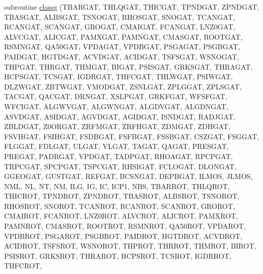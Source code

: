 \begin{DoxyCompactItemize}
subroutine \hyperlink{CLASSG_8f_ab216eee141d163cce79e9606e2374659}{classg} (T\+B\+A\+R\+G\+A\+T, T\+H\+L\+Q\+G\+A\+T, T\+H\+I\+C\+G\+A\+T, T\+P\+N\+D\+G\+A\+T, Z\+P\+N\+D\+G\+A\+T, T\+B\+A\+S\+G\+A\+T, A\+L\+B\+S\+G\+A\+T, T\+S\+N\+O\+G\+A\+T, R\+H\+O\+S\+G\+A\+T, S\+N\+O\+G\+A\+T, T\+C\+A\+N\+G\+A\+T, R\+C\+A\+N\+G\+A\+T, S\+C\+A\+N\+G\+A\+T, G\+R\+O\+G\+A\+T, C\+M\+A\+I\+G\+A\+T, F\+C\+A\+N\+G\+A\+T, L\+N\+Z0\+G\+A\+T, A\+L\+V\+C\+G\+A\+T, A\+L\+I\+C\+G\+A\+T, P\+A\+M\+X\+G\+A\+T, P\+A\+M\+N\+G\+A\+T, C\+M\+A\+S\+G\+A\+T, R\+O\+O\+T\+G\+A\+T, R\+S\+M\+N\+G\+A\+T, Q\+A50\+G\+A\+T, V\+P\+D\+A\+G\+A\+T, V\+P\+D\+B\+G\+A\+T, P\+S\+G\+A\+G\+A\+T, P\+S\+G\+B\+G\+A\+T, P\+A\+I\+D\+G\+A\+T, H\+G\+T\+D\+G\+A\+T, A\+C\+V\+D\+G\+A\+T, A\+C\+I\+D\+G\+A\+T, T\+S\+F\+S\+G\+A\+T, W\+S\+N\+O\+G\+A\+T, T\+H\+P\+G\+A\+T, T\+H\+R\+G\+A\+T, T\+H\+M\+G\+A\+T, B\+I\+G\+A\+T, P\+S\+I\+S\+G\+A\+T, G\+R\+K\+S\+G\+A\+T, T\+H\+R\+A\+G\+A\+T, H\+C\+P\+S\+G\+A\+T, T\+C\+S\+G\+A\+T, I\+G\+D\+R\+G\+A\+T, T\+H\+F\+C\+G\+A\+T, T\+H\+L\+W\+G\+A\+T, P\+S\+I\+W\+G\+A\+T, D\+L\+Z\+W\+G\+A\+T, Z\+B\+T\+W\+G\+A\+T, V\+M\+O\+D\+G\+A\+T, Z\+S\+N\+L\+G\+A\+T, Z\+P\+L\+G\+G\+A\+T, Z\+P\+L\+S\+G\+A\+T, T\+A\+C\+G\+A\+T, Q\+A\+C\+G\+A\+T, D\+R\+N\+G\+A\+T, X\+S\+L\+P\+G\+A\+T, G\+R\+K\+F\+G\+A\+T, W\+F\+S\+F\+G\+A\+T, W\+F\+C\+I\+G\+A\+T, A\+L\+G\+W\+V\+G\+A\+T, A\+L\+G\+W\+N\+G\+A\+T, A\+L\+G\+D\+V\+G\+A\+T, A\+L\+G\+D\+N\+G\+A\+T, A\+S\+V\+D\+G\+A\+T, A\+S\+I\+D\+G\+A\+T, A\+G\+V\+D\+G\+A\+T, A\+G\+I\+D\+G\+A\+T, I\+S\+N\+D\+G\+A\+T, R\+A\+D\+J\+G\+A\+T, Z\+B\+L\+D\+G\+A\+T, Z0\+O\+R\+G\+A\+T, Z\+R\+F\+M\+G\+A\+T, Z\+R\+F\+H\+G\+A\+T, Z\+D\+M\+G\+A\+T, Z\+D\+H\+G\+A\+T, F\+S\+V\+H\+G\+A\+T, F\+S\+I\+H\+G\+A\+T, F\+S\+D\+B\+G\+A\+T, F\+S\+F\+B\+G\+A\+T, F\+S\+S\+B\+G\+A\+T, C\+S\+Z\+G\+A\+T, F\+S\+G\+G\+A\+T, F\+L\+G\+G\+A\+T, F\+D\+L\+G\+A\+T, U\+L\+G\+A\+T, V\+L\+G\+A\+T, T\+A\+G\+A\+T, Q\+A\+G\+A\+T, P\+R\+E\+S\+G\+A\+T, P\+R\+E\+G\+A\+T, P\+A\+D\+R\+G\+A\+T, V\+P\+D\+G\+A\+T, T\+A\+D\+P\+G\+A\+T, R\+H\+O\+A\+G\+A\+T, R\+P\+C\+P\+G\+A\+T, T\+R\+P\+C\+G\+A\+T, S\+P\+C\+P\+G\+A\+T, T\+S\+P\+C\+G\+A\+T, R\+H\+S\+I\+G\+A\+T, F\+C\+L\+O\+G\+A\+T, D\+L\+O\+N\+G\+A\+T, G\+G\+E\+O\+G\+A\+T, G\+U\+S\+T\+G\+A\+T, R\+E\+F\+G\+A\+T, B\+C\+S\+N\+G\+A\+T, D\+E\+P\+B\+G\+A\+T, I\+L\+M\+O\+S, J\+L\+M\+O\+S, N\+M\+L, N\+L, N\+T, N\+M, I\+L\+G, I\+G, I\+C, I\+C\+P1, N\+B\+S, T\+B\+A\+R\+R\+O\+T, T\+H\+L\+Q\+R\+O\+T, T\+H\+I\+C\+R\+O\+T, T\+P\+N\+D\+R\+O\+T, Z\+P\+N\+D\+R\+O\+T, T\+B\+A\+S\+R\+O\+T, A\+L\+B\+S\+R\+O\+T, T\+S\+N\+O\+R\+O\+T, R\+H\+O\+S\+R\+O\+T, S\+N\+O\+R\+O\+T, T\+C\+A\+N\+R\+O\+T, R\+C\+A\+N\+R\+O\+T, S\+C\+A\+N\+R\+O\+T, G\+R\+O\+R\+O\+T, C\+M\+A\+I\+R\+O\+T, F\+C\+A\+N\+R\+O\+T, L\+N\+Z0\+R\+O\+T, A\+L\+V\+C\+R\+O\+T, A\+L\+I\+C\+R\+O\+T, P\+A\+M\+X\+R\+O\+T, P\+A\+M\+N\+R\+O\+T, C\+M\+A\+S\+R\+O\+T, R\+O\+O\+T\+R\+O\+T, R\+S\+M\+N\+R\+O\+T, Q\+A50\+R\+O\+T, V\+P\+D\+A\+R\+O\+T, V\+P\+D\+B\+R\+O\+T, P\+S\+G\+A\+R\+O\+T, P\+S\+G\+B\+R\+O\+T, P\+A\+I\+D\+R\+O\+T, H\+G\+T\+D\+R\+O\+T, A\+C\+V\+D\+R\+O\+T, A\+C\+I\+D\+R\+O\+T, T\+S\+F\+S\+R\+O\+T, W\+S\+N\+O\+R\+O\+T, T\+H\+P\+R\+O\+T, T\+H\+R\+R\+O\+T, T\+H\+M\+R\+O\+T, B\+I\+R\+O\+T, P\+S\+I\+S\+R\+O\+T, G\+R\+K\+S\+R\+O\+T, T\+H\+R\+A\+R\+O\+T, H\+C\+P\+S\+R\+O\+T, T\+C\+S\+R\+O\+T, I\+G\+D\+R\+R\+O\+T, T\+H\+F\+C\+R\+O\+T, 
\end{DoxyCompactItemize}
